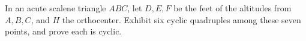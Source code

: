 In an acute scalene triangle $ABC$, let $D,E,F$ be the feet of the altitudes from $A,B,C$, and $H$ the orthocenter. Exhibit six cyclic quadruples among these seven points, and prove each is cyclic.
